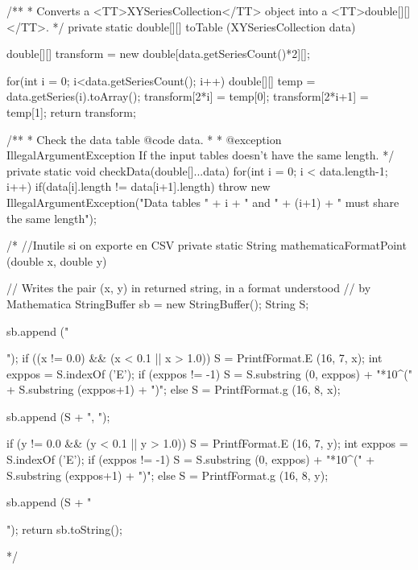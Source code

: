 \begin{code}
\begin{hide}
   /**
    * Converts a <TT>XYSeriesCollection</TT> object into a <TT>double[][]</TT>.
    */
   private static double[][] toTable (XYSeriesCollection data) {
      double[][] transform = new double[data.getSeriesCount()*2][];

      for(int i = 0; i<data.getSeriesCount(); i++) {
         double[][] temp = data.getSeries(i).toArray();
         transform[2*i] = temp[0];
         transform[2*i+1] = temp[1];
      }
      return transform;
   }


   /**
    * Check the data table {@code data}.
    *
    * @exception  IllegalArgumentException   If the input tables doesn't have the same length.
    */
   private static void checkData(double[]...data) {
      for(int i = 0; i < data.length-1; i++) {
         if(data[i].length != data[i+1].length)
            throw new IllegalArgumentException("Data tables " + i + " and " + (i+1) + " must share the same length");
      }
   }

/* //Inutile si on exporte en CSV
   private static String mathematicaFormatPoint (double x, double y) {
      // Writes the pair (x, y) in returned string, in a format understood
      // by Mathematica
      StringBuffer sb = new StringBuffer();
      String S;

      sb.append ("   { ");
      if ((x != 0.0) && (x < 0.1 || x > 1.0)) {
         S = PrintfFormat.E (16, 7, x);
         int exppos = S.indexOf ('E');
         if (exppos != -1)
            S = S.substring (0, exppos) + "*10^(" +
                             S.substring (exppos+1) + ")";
      }
      else
         S = PrintfFormat.g (16, 8, x);

      sb.append (S + ",     ");

      if (y != 0.0 && (y < 0.1 || y > 1.0)) {
         S = PrintfFormat.E (16, 7, y);
         int exppos = S.indexOf ('E');
         if (exppos != -1)
            S = S.substring (0, exppos) + "*10^(" +
                             S.substring (exppos+1) + ")";
      }
      else
        S = PrintfFormat.g (16, 8, y);

      sb.append (S + " }");
      return sb.toString();
   }*/\end{hide}
\end{code}
\begin{code}
\begin{hide}
}\end{hide}
\end{code}
